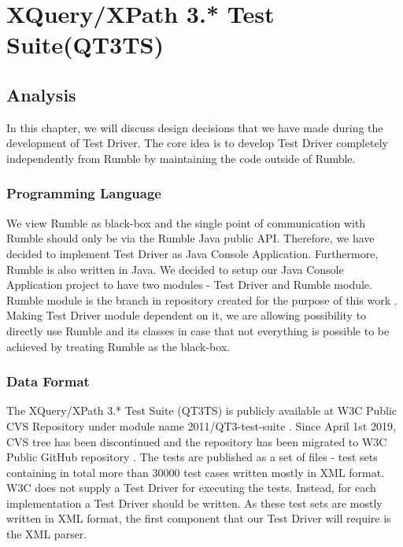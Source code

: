\chapter{XQuery/XPath 3.* Test Suite(QT3TS)}
\section{Analysis}
In this chapter, we will discuss design decisions that we have made during the development of Test Driver. The core idea is to develop Test Driver completely independently from Rumble by maintaining the code outside of Rumble.

\subsection{Programming Language}
 We view Rumble as black-box and the single point of communication with Rumble should only be via the Rumble Java public API. Therefore, we have decided to implement Test Driver as Java Console Application. Furthermore, Rumble is also written in Java. We decided to setup our Java Console Application project to have two modules - Test Driver and Rumble module. Rumble module is the branch in repository created for the purpose of this work \cite{RumbleBranch}. Making Test Driver module dependent on it, we are allowing possibility to directly use Rumble and its classes in case that not everything is possible to be achieved by treating Rumble as the black-box. 

\subsection{Data Format}
The XQuery/XPath 3.* Test Suite (QT3TS) is publicly available at W3C Public CVS Repository under module name 2011/QT3-test-suite \cite{TestSuiteCVSRepository}. Since April 1st 2019, CVS tree has been discontinued and the repository has been migrated to W3C Public GitHub repository \cite{TestSuiteGitHubRepository}. The tests are published as a set of files - test sets containing in total more than 30000 test cases written mostly in XML format. W3C does not supply a Test Driver for executing the tests. Instead, for each implementation a Test Driver should be written. As these test sets are mostly written in XML format, the first component that our Test Driver will require is the XML parser. 

